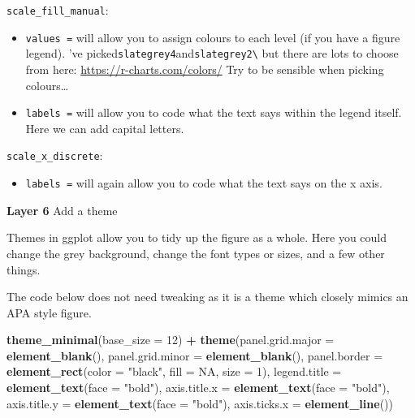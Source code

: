 \documentclass[
]{book}
\newenvironment{Shaded}{\begin{snugshade}}{\end{snugshade}}
\newcommand{\AttributeTok}[1]{\textcolor[rgb]{0.13,0.29,0.53}{#1}}
\newcommand{\ConstantTok}[1]{\textcolor[rgb]{0.56,0.35,0.01}{#1}}
\newcommand{\DecValTok}[1]{\textcolor[rgb]{0.00,0.00,0.81}{#1}}
\newcommand{\FunctionTok}[1]{\textcolor[rgb]{0.13,0.29,0.53}{\textbf{#1}}}
\newcommand{\NormalTok}[1]{#1}
\newcommand{\SpecialCharTok}[1]{\textcolor[rgb]{0.81,0.36,0.00}{\textbf{#1}}}
\newcommand{\StringTok}[1]{\textcolor[rgb]{0.31,0.60,0.02}{#1}}
\providecommand{\tightlist}{%
  \setlength{\itemsep}{0pt}\setlength{\parskip}{0pt}}
\begin{document}
\texttt{scale\_fill\_manual}:

\begin{itemize}
\item
  \texttt{values\ =} will allow you to assign colours to each level (if you have a figure legend). 've picked\texttt{slategrey4}and\texttt{slategrey2\textbackslash{}} but there are lots to choose from here: \url{https://r-charts.com/colors/} Try to be sensible when picking colours\ldots{}
\item
  \texttt{labels\ =} will allow you to code what the text says within the legend itself. Here we can add capital letters.
\end{itemize}

\texttt{scale\_x\_discrete}:

\begin{itemize}
\tightlist
\item
  \texttt{labels\ =} will again allow you to code what the text says on the x axis.
\end{itemize}

\textbf{Layer 6} Add a theme

Themes in ggplot allow you to tidy up the figure as a whole. Here you could change the grey background, change the font types or sizes, and a few other things.

The code below does not need tweaking as it is a theme which closely mimics an APA style figure.

\begin{Shaded}
\begin{Highlighting}[]
\FunctionTok{theme\_minimal}\NormalTok{(}\AttributeTok{base\_size =} \DecValTok{12}\NormalTok{) }\SpecialCharTok{+}
  \FunctionTok{theme}\NormalTok{(}\AttributeTok{panel.grid.major =} \FunctionTok{element\_blank}\NormalTok{(),}
        \AttributeTok{panel.grid.minor =} \FunctionTok{element\_blank}\NormalTok{(),}
        \AttributeTok{panel.border =} \FunctionTok{element\_rect}\NormalTok{(}\AttributeTok{color =} \StringTok{"black"}\NormalTok{, }\AttributeTok{fill =} \ConstantTok{NA}\NormalTok{, }\AttributeTok{size =} \DecValTok{1}\NormalTok{),}
        \AttributeTok{legend.title =} \FunctionTok{element\_text}\NormalTok{(}\AttributeTok{face =} \StringTok{"bold"}\NormalTok{),}
        \AttributeTok{axis.title.x =} \FunctionTok{element\_text}\NormalTok{(}\AttributeTok{face =} \StringTok{"bold"}\NormalTok{),}
        \AttributeTok{axis.title.y =} \FunctionTok{element\_text}\NormalTok{(}\AttributeTok{face =} \StringTok{"bold"}\NormalTok{),}
        \AttributeTok{axis.ticks.x =} \FunctionTok{element\_line}\NormalTok{())}
\end{Highlighting}
\end{Shaded}
\end{document}

